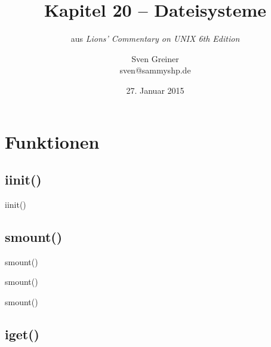 \documentclass{beamer}
\title{Kapitel 20 -- Dateisysteme}
\subtitle{aus \emph{Lions' Commentary on UNIX 6th Edition}}
\author{Sven Greiner\\\footnotesize\ttfamily sven@sammyshp.de}
\date{27. Januar 2015}
\begin{document}


{
\begin{frame}
    \titlepage
\end{frame}
}




{
\begin{frame}
    \label{TableOfContents}
    \vfill
    \tableofcontents
    \vfill
\end{frame}
}




\section{Funktionen}

\subsection{iinit()}

\begin{frame}{iinit()}
\end{frame}




\subsection{smount()}

\begin{frame}{smount()}
\end{frame}

\begin{frame}{smount()}
\end{frame}

\begin{frame}{smount()}
\end{frame}




\subsection{iget()}
\end{document}
